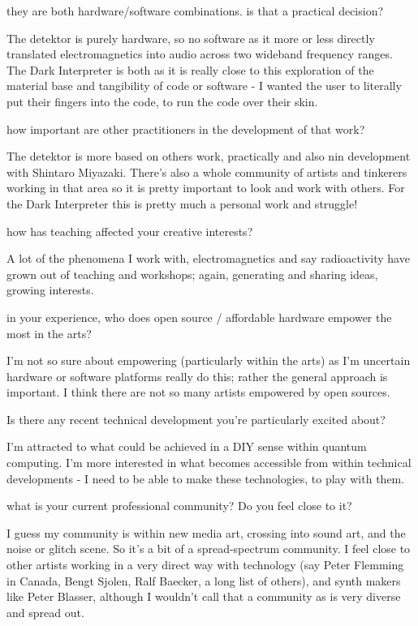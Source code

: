they are both hardware/software combinations. is that a practical decision? 

The detektor is purely hardware, so no software as it more or less
directly translated electromagnetics into audio across two wideband
frequency ranges. The Dark Interpreter is both as it is really close
to this exploration of the material base and tangibility of code or
software - I wanted the user to literally put their fingers into the
code, to run the code over their skin.


how important are other practitioners in the development of that work? 

The detektor is more based on others work, practically and also nin
development with Shintaro Miyazaki. There's also a whole community of
artists and tinkerers working in that area so it is pretty important
to look and work with others. For the Dark Interpreter this is pretty
much a personal work and struggle!


how has teaching affected your creative interests? 

A lot of the phenomena I work with, electromagnetics and say
radioactivity have grown out of teaching and workshops; again,
generating and sharing ideas, growing interests.


in your experience, who does open source / affordable hardware empower the most in the arts? 

I'm not so sure about empowering (particularly within the arts) as I'm
uncertain hardware or software platforms really do this; rather the
general approach is important. I think there are not so many artists
empowered by open sources.


Is there any recent technical development you're particularly excited about? 

I'm attracted to what could be achieved in a DIY sense within quantum
computing. I'm more interested in what becomes accessible from within
technical developments - I need to be able to make these
technologies, to play with them.


what is your current professional community? Do you feel close to it? 

I guess my community is within new media art, crossing into sound art,
and the noise or glitch scene. So it's a bit of a spread-spectrum
community. I feel close to other artists working in a very direct way
with technology (say Peter Flemming in Canada, Bengt Sjolen, Ralf
Baecker, a long list of others), and synth makers like Peter Blasser,
although I wouldn't call that a community as is very diverse and
spread out.

